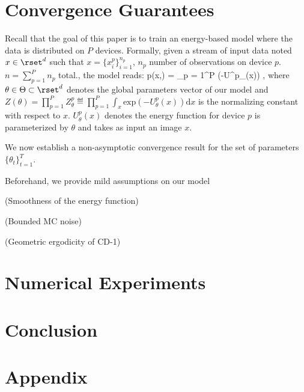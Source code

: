 \documentclass[11pt]{article}
\begin{document}
\section{Convergence Guarantees}\label{sec:theory}

Recall that the goal of this paper is to train an energy-based model where the data is distributed on $P$ devices.
Formally, given a stream of input data noted $x \in \rset^d$ such that $x = \{ x^p_{i} \}_{i=1}^{n_p}$, $n_p$ number of observations on device $p$. $n = \sum_{p=1}^P n_p$ total., the model reads:
\beq\label{eq:distebm}
p(x,\theta) = \prod_{p = 1}^P  (-U^p_{\theta}(x)) \eqsp,
\eeq
where $\theta \in \Theta \subset \rset^d$ denotes the global parameters vector of our model and $Z(\theta) = \prod_{p=1}^P Z^p_{\theta} \eqdef \prod_{p=1}^P \int_{x} \mathrm{exp}(-U^p_{\theta}(x)) \textrm{d}x$ is the normalizing constant with respect to $x$.
$U^p_{\theta}(x)$ denotes the energy function for device $p$ is parameterized by $\theta$ and takes as input an image $x$.




We now establish a non-asymptotic convergence result for the set of parameters $\{ \theta_{t}\}_{t=1}^T$.

Beforehand, we provide mild assumptions on our model 

\begin{assumption} (Smoothness of the energy function)
\end{assumption}

\begin{assumption} (Bounded MC noise)
\end{assumption}

\begin{assumption} (Geometric ergodicity of CD-1)
\end{assumption}

\section{Numerical Experiments}\label{sec:numericals}


\section{Conclusion}\label{sec:conclusion}



\newpage



\newpage
\appendix 

\section{Appendix}\label{sec:appendix}


\end{document}
